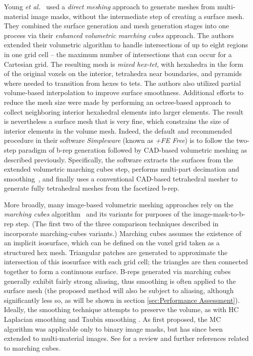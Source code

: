 Young \textit{et al.}~\cite{young_2008} used a \textit{direct meshing} approach to generate meshes from multi-material image masks, without the intermediate step of creating a surface mesh. They combined the surface generation and mesh generation stages into one process via their \textit{enhanced volumetric marching cubes} approach.  The authors extended their volumetric algorithm to handle intersections of up to eight regions in one grid cell -- the maximum number of intersections that can occur for a Cartesian grid.  The resulting mesh is \textit{mixed hex-tet}, with hexahedra in the form of the original voxels on the interior, tetrahedra near boundaries, and pyramids where needed to transition from hexes to tets. The authors also utilized partial volume-based interpolation to improve surface smoothness. Additional efforts to reduce the mesh size were made by performing an octree-based approach to collect neighboring interior hexahedral elements into larger elements.  The result is nevertheless a surface mesh that is very fine, which constrains the size of interior elements in the volume mesh.  Indeed, the default and recommended procedure in their software \textit{Simpleware} (known as \textit{+FE Free}) is to follow the two-step paradigm of b-rep generation followed by CAD-based volumetric meshing as described previously. Specifically, the software extracts the surfaces from the extended volumetric marching cubes step, performs multi-part decimation and smoothing~\cite{egst}, and finally uses a conventional CAD-based tetrahedral mesher to generate fully tetrahedral meshes from the facetized b-rep.

More broadly, many image-based volumetric meshing approaches rely on the \textit{marching cubes} algorithm~\cite{lorensen_1987} and its variants for purposes of the image-mask-to-b-rep step.  (The first two of the three comparison techniques described in  incorporate marching-cubes variants.)  Marching cubes assumes the existence of an implicit isosurface, which can be defined on the voxel grid taken as a structured hex mesh.  Triangular patches are generated to approximate the intersection of this isosurface with each grid cell; the triangles are then connected together to form a continuous surface. B-reps generated via marching cubes generally exhibit fairly strong aliasing, thus smoothing is often applied to the surface mesh (the proposed method will also be subject to aliasing, although significantly less so, as will be shown in section \ref{sec:Performance Assessment}). Ideally, the smoothing technique attempts to preserve the volume, as with HC Laplacian smoothing\cite{vollmer_1999} and Taubin smoothing \cite{taubin1995signal, taubin_1995}.  As first proposed, the MC algorithm was applicable only to binary image masks, but has since been extended to multi-material images.  See \cite{newman2006} for a review and further references related to marching cubes.

